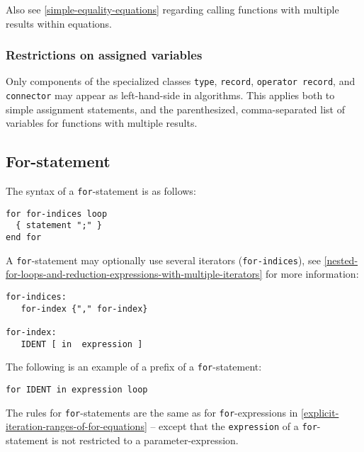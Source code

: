 \begin{nonnormative}
Also see \cref{simple-equality-equations} regarding calling functions with
multiple results within equations.
\end{nonnormative}

\subsubsection{Restrictions on assigned variables}\label{restrictions-on-assigned-variables}

Only components of the specialized classes \lstinline!type!, \lstinline!record!, \lstinline!operator record!, and \lstinline!connector! may appear as left-hand-side in algorithms.
This applies both to simple assignment statements, and the parenthesized, comma-separated list of variables for functions with multiple results.

\subsection{For-statement}\label{for-statement}

The syntax of a \lstinline!for!-statement is as follows:
\begin{lstlisting}[language=grammar]
for for-indices loop
  { statement ";" }
end for
\end{lstlisting}
A \lstinline!for!-statement may optionally use several iterators (\lstinline!for-indices!), see \cref{nested-for-loops-and-reduction-expressions-with-multiple-iterators} for more information:
\begin{lstlisting}[language=grammar]
for-indices:
   for-index {"," for-index}

for-index:
   IDENT [ in  expression ]
\end{lstlisting}
The following is an example of a prefix of a \lstinline!for!-statement:
\begin{lstlisting}[language=modelica]
for IDENT in expression loop
\end{lstlisting}
The rules for \lstinline!for!-statements are the same as for \lstinline!for!-expressions in \cref{explicit-iteration-ranges-of-for-equations} -- except that the \lstinline!expression! of a \lstinline!for!-statement is not restricted to a parameter-expression.

